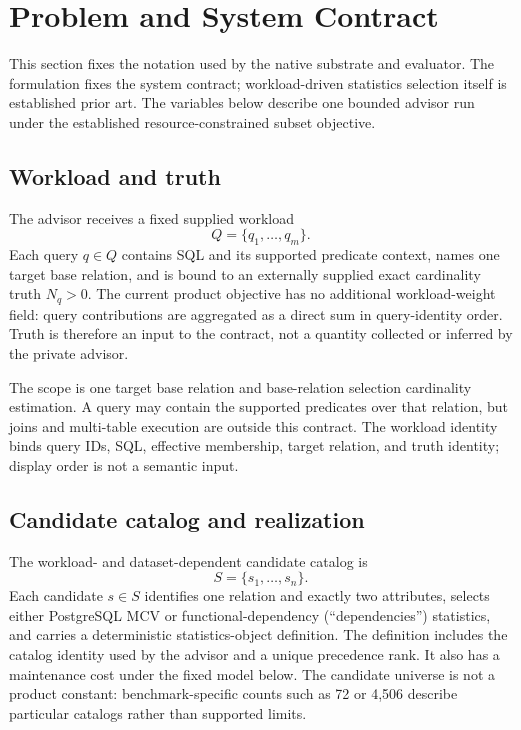 \section{Problem and System Contract}
\label{sec:problem}

This section fixes the notation used by the native substrate and evaluator.
The formulation fixes the system contract; workload-driven statistics
selection itself is established prior art.  The variables below describe one
bounded advisor run under the established resource-constrained subset
objective.

\subsection{Workload and truth}

The advisor receives a fixed supplied workload
\[
 Q=\{q_1,\ldots,q_m\}.
\]
Each query $q\in Q$ contains SQL and its supported predicate context, names
one target base relation, and is bound to an externally supplied exact
cardinality truth $N_q>0$.  The current product objective has no additional
workload-weight field: query contributions are aggregated as a direct sum in
query-identity order.  Truth is therefore an input to the contract, not a
quantity collected or inferred by the private advisor.

The scope is one target base relation and base-relation selection cardinality
estimation.  A query may contain the supported predicates over that relation,
but joins and multi-table execution are outside this contract.  The workload
identity binds query IDs, SQL, effective membership, target relation, and
truth identity; display order is not a semantic input.

\subsection{Candidate catalog and realization}

The workload- and dataset-dependent candidate catalog is
\[
 S=\{s_1,\ldots,s_n\}.
\]
Each candidate $s\in S$ identifies one relation and exactly two attributes,
selects either PostgreSQL MCV or functional-dependency (``dependencies'')
statistics, and carries a deterministic statistics-object definition.  The
definition includes the catalog identity used by the advisor and a unique
precedence rank.  It also has a maintenance cost under the fixed model below.
The candidate universe is not a product constant: benchmark-specific counts
such as 72 or 4,506 describe particular catalogs rather than supported limits.

